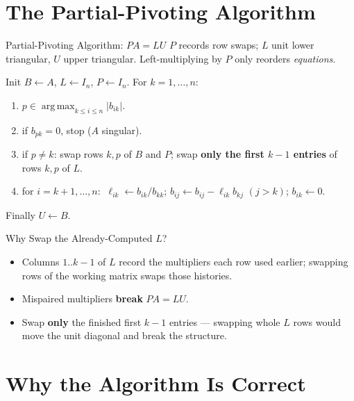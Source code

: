 \documentclass[11pt,aspectratio=169]{beamer}
\begin{document}
\section{The Partial-Pivoting Algorithm}

\begin{frame}{Partial-Pivoting Algorithm: $PA=LU$}
  \small
  $P$ records row swaps; $L$ unit lower triangular, $U$ upper triangular. Left-multiplying
  by $P$ only reorders \emph{equations}.
  \medskip

  Init $B\gets A$, $L\gets I_n$, $P\gets I_n$. For $k=1,\dots,n$:
  \begin{enumerate}
    \item $p\in\operatorname{arg\,max}_{k\le i\le n}|b_{ik}|$.
    \item if $b_{pk}=0$, stop ($A$ singular).
    \item if $p\neq k$: swap rows $k,p$ of $B$ and $P$; swap \textbf{only the first
      $k-1$ entries} of rows $k,p$ of $L$.
    \item for $i=k+1,\dots,n$: $\ \ell_{ik}\gets b_{ik}/b_{kk}$;\;
      $b_{ij}\gets b_{ij}-\ell_{ik}b_{kj}$ $(j>k)$;\; $b_{ik}\gets0$.
  \end{enumerate}
  Finally $U\gets B$.
\end{frame}

\begin{frame}{Why Swap the Already-Computed $L$?}
  \begin{itemize}
    \item Columns $1..k-1$ of $L$ record the multipliers each row used earlier; swapping
      rows of the working matrix swaps those histories.
    \item Mispaired multipliers \textbf{break} $PA=LU$.
    \item Swap \textbf{only} the finished first $k-1$ entries --- swapping whole $L$ rows
      would move the unit diagonal and break the structure.
  \end{itemize}
\end{frame}

\section{Why the Algorithm Is Correct}
\end{document}
